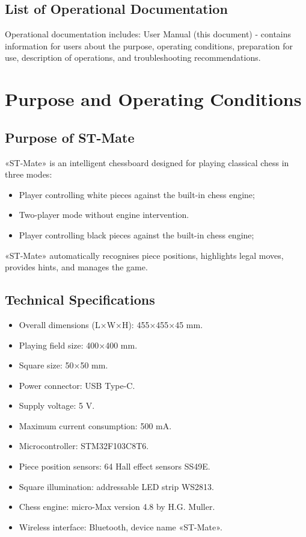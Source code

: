 \documentclass[a4paper,12pt]{article}
\begin{document}
\subsection{List of Operational Documentation}
Operational documentation includes:
User Manual (this document) - contains information for users about the purpose, operating conditions, preparation for use, description of operations, and troubleshooting recommendations.

\section{Purpose and Operating Conditions}
\label{sec:purpose}

\subsection{Purpose of ST-Mate}
«ST-Mate» is an intelligent chessboard designed for playing classical chess in three modes:
\begin{itemize}
    \item Player controlling white pieces against the built-in chess engine;
    \item Two-player mode without engine intervention.
    \item Player controlling black pieces against the built-in chess engine;
\end{itemize}

«ST-Mate» automatically recognises piece positions, highlights legal moves, provides hints, and manages the game.

\subsection{Technical Specifications}

\begin{itemize}
    \item Overall dimensions (L×W×H): 455×455×45 mm.
    \item Playing field size: 400×400 mm.
    \item Square size: 50×50 mm.
    \item Power connector: USB Type-C.
    \item Supply voltage: 5 V.
    \item Maximum current consumption: 500 mA.
    \item Microcontroller: STM32F103C8T6.
    \item Piece position sensors: 64 Hall effect sensors SS49E.
    \item Square illumination: addressable LED strip WS2813.
    \item Chess engine: micro-Max version 4.8 by H.G. Muller.
    \item Wireless interface: Bluetooth, device name «ST-Mate».
\end{itemize}
\end{document}
